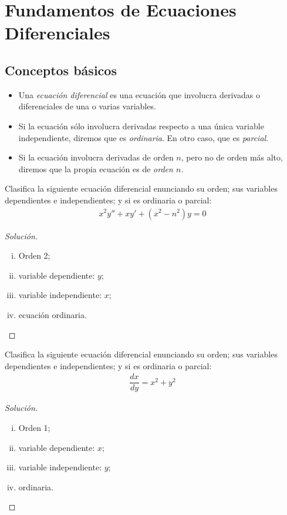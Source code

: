 \section{Fundamentos de Ecuaciones Diferenciales}

\subsection{Conceptos básicos}

\begin{definicion}
	\begin{itemize}
	\item 	Una \emph{ecuación diferencial} es una ecuación que involucra derivadas o diferenciales de una o varias variables.
	\item Si la ecuación sólo involucra derivadas respecto a una única variable independiente, diremos que es \emph{ordinaria}.  En otro caso, que es \emph{parcial}.
	\item Si la ecuación involucra derivadas de orden $n$, pero no de orden más alto, diremos que la propia ecuación es de \emph{orden $n$.}
\end{itemize}
\end{definicion}



\begin{resuelto}
	Clasifica la siguiente ecuación diferencial enunciando su orden; sus variables dependientes e independientes; y si es ordinaria o parcial:
	\begin{align}
	x^2y''+xy'+\left(x^2-n^2\right)y = 0
\end{align}
\end{resuelto}

\begin{proof}[Solución]
	\begin{enumerate}[(i)]
		\item Orden 2;
		\item variable dependiente: $ y $;
		\item variable independiente: $ x $;
		\item ecuación ordinaria.
	\end{enumerate}
\end{proof}


\begin{resuelto}
	Clasifica la siguiente ecuación diferencial enunciando su orden; sus variables dependientes e independientes; y si es ordinaria o parcial:
\begin{align}
	\dfrac{dx}{dy}= x^{2}+y^{2}
\end{align}
\end{resuelto}
\begin{proof}[Solución]
	\begin{enumerate}[(i)]
		\item Orden 1;
		\item variable dependiente: $ x $;
		\item variable independiente: $ y $;
		\item ordinaria.
	\end{enumerate}
\end{proof}


